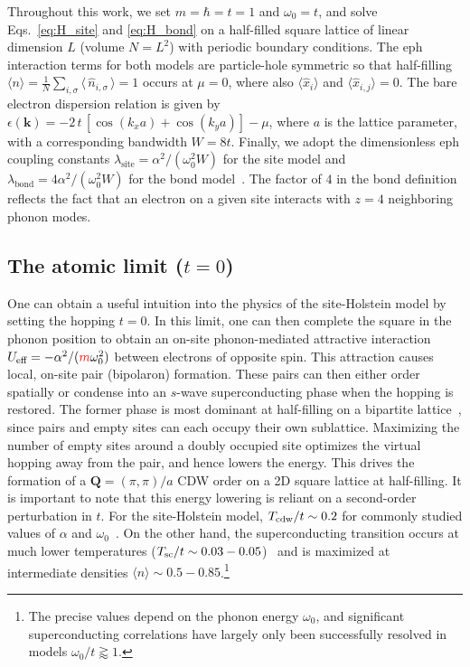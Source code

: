 \documentclass[%
reprint,
superscriptaddress,
nofootinbib,
twocolumn,
amsmath,amssymb,
aps,
prb,
]{revtex4-2}
\begin{document}
Throughout this work, we set $m=\hbar =t=1$ and $\omega_0 = t$, and solve Eqs.~\eqref{eq:H_site} and \eqref{eq:H_bond} on a half-filled square lattice of linear dimension $L$ (volume $N=L^2$) with periodic boundary conditions. The \gls*{eph} interaction terms for both models are particle-hole symmetric so that half-filling $\langle n \rangle=\frac{1}{N}\sum_{i,\sigma}\langle \, \hat n_{i,\sigma} \, \rangle = 1$ occurs at $\mu=0$, where also $\langle \hat{x}_i \rangle$ and $\langle \hat{x}_{i,j} \rangle = 0$. The bare electron dispersion relation is given by $\epsilon(\boldsymbol{k})=-2\,t \, [\cos(k_xa)+\cos(k_ya)]-\mu$, where $a$ is the lattice parameter, with a corresponding bandwidth $W=8t$. Finally, we adopt the dimensionless \gls*{eph} coupling constants $\lambda_\text{site}=\alpha^2/(\omega_0^2W)$ for the site model and $\lambda_\text{bond} = 4\alpha^2/(\omega_0^2W)$ for the bond model~\cite{Slezak2006, Lau2007single}. The factor of $4$ in the bond definition reflects the fact that an electron on a given site interacts with $z=4$ neighboring phonon modes.

\subsection{The atomic limit ($t=0$)}\label{sec:model_atomic}
One can obtain a useful intuition into the physics of the site-Holstein model by setting the hopping $t=0$. In this limit, one can then complete the square in the phonon position to obtain an on-site phonon-mediated attractive interaction $U_{\text{eff}} =-\alpha^2/(\textcolor{red}{m}\omega_0^2)$ between electrons of opposite spin. This attraction causes local, on-site pair (bipolaron) formation. These pairs can then either order spatially or condense into an $s$-wave superconducting phase when the hopping is restored. The former phase is most dominant at half-filling on a bipartite lattice~\cite{marsiglio90, scalettar89, bradley21, nosarzewski21}, since pairs and empty sites can each occupy their own sublattice. Maximizing the number of empty sites around a doubly occupied site optimizes the virtual hopping away from the pair, and hence lowers the energy. This drives the formation of a $\boldsymbol{Q} = (\pi,\pi)/a$ \gls*{CDW} order on a \gls*{2D} square lattice at half-filling. It is important to note that this energy lowering is reliant on a second-order perturbation in $t$. For the site-Holstein model, $T_{\rm cdw}/t \sim 0.2$ for commonly studied values of $\alpha$ and $\omega_0$~\cite{marsiglio90, scalettar89, esterlis18, dee2019temperature, bradley21, nosarzewski21}. On the other hand, the superconducting transition occurs at much lower temperatures ($T_{\rm sc}/t \sim 0.03-0.05$)~\cite{bradley21, nosarzewski21} and is maximized at intermediate densities $\langle n \rangle \sim 0.5-0.85$.\footnote{The precise values depend on the phonon energy $\omega_0$, and significant superconducting correlations have largely only been successfully resolved in models $\omega_0/t \gtrapprox 1$.}
\end{document}
